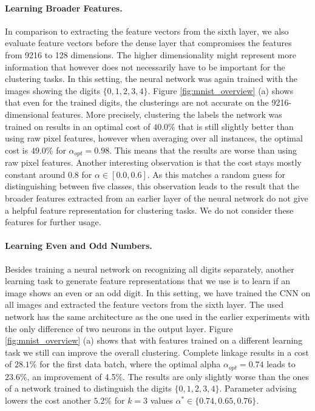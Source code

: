 \paragraph{Learning Broader Features.} In comparison to extracting the feature vectors from the sixth layer, we also evaluate feature vectors before the dense layer that compromises the features from 9216 to 128 dimensions. The higher dimensionality might represent more information that however does not necessarily have to be important for the clustering tasks. In this setting, the neural network was again trained with the images showing the digits $\{0,1,2,3,4\}$. Figure \ref{fig:mnist_overview} (a) shows that even for the trained digits, the clusterings are not accurate on the 9216-dimensional features. More precisely, clustering the labels the network was trained on results in an optimal cost of $40.0\%$ that is still slightly better than using raw pixel features, however when averaging over all instances, the optimal cost is $49.0\%$ for $\alpha_{opt} = 0.98$. This means that the results are worse than using raw pixel features. Another interesting observation is that the cost stays mostly constant around $0.8$ for $\alpha \in [0.0,0.6]$. As this matches a random guess for distinguishing between five classes, this observation leads to the result that the broader features extracted from an earlier layer of the neural network do not give a helpful feature representation for clustering tasks. We do not consider these features for further usage.

\paragraph{Learning Even and Odd Numbers.} Besides training a neural network on recognizing all digits separately, another learning task to generate feature representations that we use is to learn if an image shows an even or an odd digit. In this setting, we have trained the CNN on all images and extracted the feature vectors from the sixth layer. The used network has the same architecture as the one used in the earlier experiments with the only difference of two neurons in the output layer. Figure \ref{fig:mnist_overview} (a) shows that with features trained on a different learning task we still can improve the overall clustering. Complete linkage results in a cost of $28.1\%$ for the first data batch, where the optimal alpha $\alpha_{opt} = 0.74$ leads to $23.6\%$, an improvement of 4.5\%. The results are only slightly worse than the ones of a network trained to distinguish the digits $\{0,1,2,3,4\}$. Parameter advising lowers the cost another $5.2\%$ for $k = 3$ values $\alpha^* \in \{0.74, 0.65, 0.76\}$.\\


